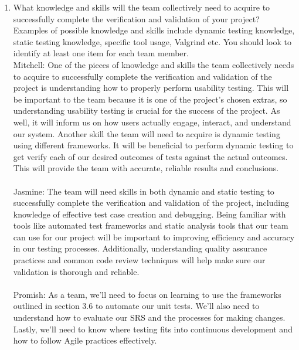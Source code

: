 \documentclass[12pt, titlepage]{article}
\begin{document}
\begin{enumerate}
  \item What knowledge and skills will the team collectively need to acquire to
  successfully complete the verification and validation of your project?
  Examples of possible knowledge and skills include dynamic testing knowledge,
  static testing knowledge, specific tool usage, Valgrind etc.  You should look to
  identify at least one item for each team member.\\
  \newline
  \hspace{2em} Mitchell: One of the pieces of knowledge and skills the team collectively needs to acquire to 
  successfully complete the verification and validation of the project is understanding how to properly perform
  usability testing. This will be important to the team because it is one of the project's chosen extras, so understanding
  usability testing is crucial for the success of the project. As well, it will inform us on how users actually engage,
  interact, and understand our system. Another skill the team will need to acquire is dynamic testing using different frameworks.
  It will be beneficial to perform dynamic testing to get verify each of our desired outcomes of tests against the actual outcomes.
  This will provide the team with accurate, reliable results and conclusions.\\\\
  \hspace{2em} Jasmine: The team will need skills in both dynamic and static testing to successfully complete the 
  verification and validation of the project, including knowledge of effective test case creation and debugging. 
  Being familiar with tools like automated test frameworks and static analysis tools that our team can use for our 
  project will be important to improving efficiency and accuracy in our testing processes. Additionally, understanding 
  quality assurance practices and common code review techniques will help make sure our validation is thorough and reliable. \\\\
  \hspace{2em} Promish: As a team, we’ll need to focus on learning to use the frameworks outlined 
  in section 3.6 to automate our unit tests. We’ll also need to understand how to evaluate our 
  SRS and the processes for making changes. Lastly, we’ll need to know where testing fits 
  into continuous development and how to follow Agile practices effectively.\\\\

\end{enumerate}
\end{document}
